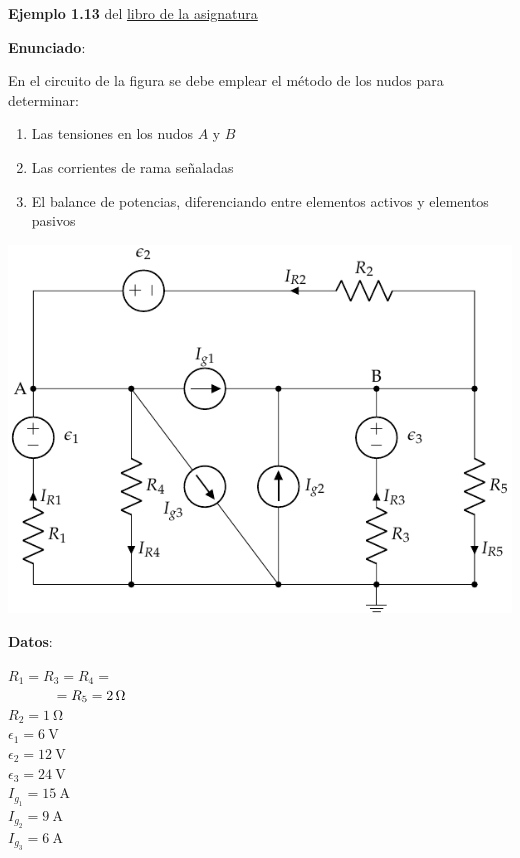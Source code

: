 \documentclass[10pt]{article}
\begin{document}
\large{\textbf{Ejemplo 1.13} del \href{https://raw.githubusercontent.com/ETSIDI-IE/tc/master/docs/TC.pdf}{libro de la asignatura}} 

\vspace{3mm}
\large{\textbf{Enunciado}}:

\vspace{3mm}
En el circuito de la figura se debe emplear el método de los nudos para determinar:

\vspace{1mm}            
\begin{enumerate}
    \item Las tensiones en los nudos $A$ y $B$
    \item Las corrientes de rama señaladas
    \item El balance de potencias, diferenciando entre elementos activos y elementos pasivos
\end{enumerate}

\vspace{3mm}

\begin{minipage}{0.78\linewidth}
  \includegraphics[scale=1.2]{figs/nudos_fuentes.pdf}
\end{minipage}
\begin{minipage}{0.20\linewidth}
    \textbf{Datos}:
    \vspace{2mm}
    
    $R_1 = R_3 = R_4 = $\\
    $ \hspace*{12mm} = R_5 = \qty{2}{\ohm}$\\ 
    $R_2 = \qty{1}{\ohm}$\\
    $\epsilon_1=\qty{6}{\volt}$\\
    $\epsilon_2 = \qty{12}{\volt}$\\
    $\epsilon_3 = \qty{24}{\volt}$\\
    $I_{g_1} = \qty{15}{\ampere}$\\
    $I_{g_2} = \qty{9}{\ampere}$\\
    $I_{g_3} = \qty{6}{\ampere}$
\end{minipage}
\end{document}
